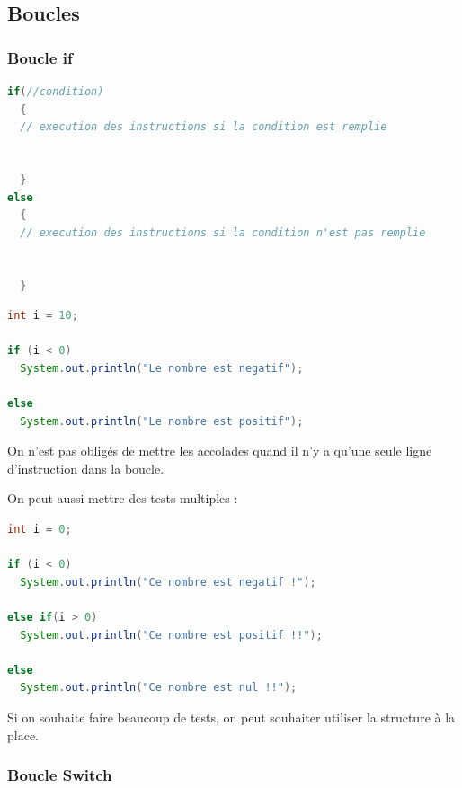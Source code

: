 \documentclass[a4paper,twoside]{article}
\begin{document}
\subsection{Boucles}
\subsubsection{Boucle if}
\begin{lstlisting}[language=java]
if(//condition)
  {
  // execution des instructions si la condition est remplie
  
  
  }
else
  {
  // execution des instructions si la condition n'est pas remplie
  
  
  }
\end{lstlisting}

\begin{exemple}
\begin{lstlisting}[language=java]
int i = 10;
 
if (i < 0)
  System.out.println("Le nombre est negatif");
 
else
  System.out.println("Le nombre est positif");
\end{lstlisting}
\end{exemple}

\begin{remarque}
On n'est pas obligés de mettre les accolades quand il n'y a qu'une seule ligne d'instruction dans la boucle.
\end{remarque}

\bigskip

On peut aussi mettre des tests multiples :
\begin{lstlisting}[language=java]
int i = 0;

if (i < 0)
  System.out.println("Ce nombre est negatif !");      

else if(i > 0)
  System.out.println("Ce nombre est positif !!");           

else  
  System.out.println("Ce nombre est nul !!");
\end{lstlisting}

Si on souhaite faire beaucoup de tests, on peut souhaiter utiliser la structure  à la place.

\subsubsection{Boucle Switch}
\end{document}
